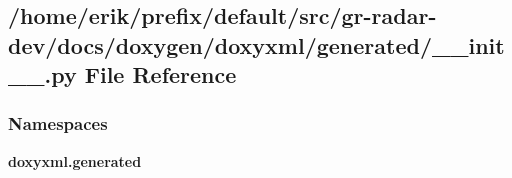\subsection{/home/erik/prefix/default/src/gr-\/radar-\/dev/docs/doxygen/doxyxml/generated/\+\_\+\+\_\+init\+\_\+\+\_\+.py File Reference}
\label{docs_2doxygen_2doxyxml_2generated_2____init_____8py}
\subsubsection*{Namespaces}
\begin{DoxyCompactItemize}
\item 
 {\bf doxyxml.\+generated}
\end{DoxyCompactItemize}
